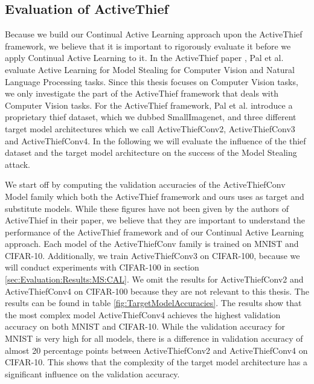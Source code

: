 \subsection{Evaluation of ActiveThief}
\label{sec:Appendix:MS:ActiveThief}
Because we build our Continual Active Learning approach upon the ActiveThief framework, we believe that it is important to rigorously evaluate it before we apply Continual Active Learning to it. In the ActiveThief paper \cite{pal2020activethief}, Pal et al. evaluate Active Learning
for Model Stealing for Computer Vision and Natural Language Processing tasks. Since this thesis focuses on Computer Vision tasks, we only investigate the part of the ActiveThief framework that deals with Computer Vision tasks. For the ActiveThief framework, Pal et al. introduce a
proprietary thief dataset, which we dubbed SmallImagenet, and three different target model architectures which we call ActiveThiefConv2, ActiveThiefConv3 and ActiveThiefConv4. In the following we will evaluate the influence of the thief dataset and the target model architecture on
the success of the Model Stealing attack. \par
We start off by computing the validation accuracies of the ActiveThiefConv Model family which both the ActiveThief framework and ours uses as target and substitute models. While these figures have not been given by the authors of ActiveThief in their paper, we believe that they are
important to understand the performance of the ActiveThief framework and of our Continual Active Learning approach. Each model of the ActiveThiefConv family is trained on MNIST and CIFAR-10. Additionally, we train ActiveThiefConv3 on CIFAR-100, because we will conduct experiments
with CIFAR-100 in section \ref{sec:Evaluation:Results:MS:CAL}. We omit the results for ActiveThiefConv2 and ActiveThiefConv4 on CIFAR-100 because they are not relevant to this thesis. The results can be found in table \ref{fig:TargetModelAccuracies}. The results show that the
most complex model ActiveThiefConv4 achieves the highest validation accuracy on both MNIST and CIFAR-10. While the validation accuracy for MNIST is very high for all models, there is a difference in validation accuracy of almost 20 percentage points between ActiveThiefConv2 and
ActiveThiefConv4 on CIFAR-10. This shows that the complexity of the target model architecture has a significant influence on the validation accuracy. \par

